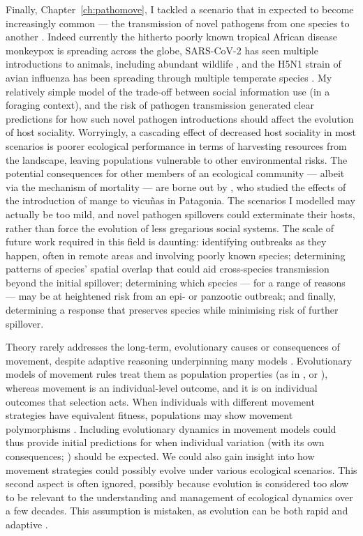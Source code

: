 Finally, Chapter~\ref{ch:pathomove}, I tackled a scenario that in expected to become increasingly common --- the transmission of novel pathogens from one species to another \citep{carlson2022a}.
Indeed currently the hitherto poorly known tropical African disease monkeypox is spreading across the globe, SARS-CoV-2 has seen multiple introductions to animals, including abundant wildlife \citep{kuchipudi2022}, and the H5N1 strain of avian influenza has been spreading through multiple temperate species \citep{wille2022}.
My relatively simple model of the trade-off between social information use (in a foraging context), and the risk of pathogen transmission generated clear predictions for how such novel pathogen introductions should affect the evolution of host sociality.
Worryingly, a cascading effect of decreased host sociality in most scenarios is poorer ecological performance in terms of harvesting resources from the landscape, leaving populations vulnerable to other environmental risks.
The potential consequences for other members of an ecological community --- albeit via the mechanism of mortality --- are borne out by \citet{monk2022}, who studied the effects of the introduction of mange to vicu\~{n}as in Patagonia.
The scenarios I modelled may actually be too mild, and novel pathogen spillovers could exterminate their hosts, rather than force the evolution of less gregarious social systems.
The scale of future work required in this field is daunting: identifying outbreaks as they happen, often in remote areas and involving poorly known species; determining patterns of species' spatial overlap that could aid cross-species transmission beyond the initial spillover; determining which species --- for a range of reasons --- may be at heightened risk from an epi- or panzootic outbreak; and finally, determining a response that preserves species while minimising risk of further spillover.

Theory rarely addresses the long-term, evolutionary causes or consequences of movement, despite adaptive reasoning underpinning many models \citep{charnov1976,fretwell1970}.
Evolutionary models of movement rules treat them as population properties (as in \cite*[]{dejager2011,dejager2020}, or \cite*[]{morris2011}), whereas movement is an individual-level outcome, and it is on individual outcomes that selection acts.
When individuals with different movement strategies have equivalent fitness, populations may show movement polymorphisms \citep{wolf2012,shaw2020,getz2015}.
Including evolutionary dynamics in movement models could thus provide initial predictions for when individual variation (with its own consequences; \cite{spiegel2017}) should be expected.
We could also gain insight into how movement strategies could possibly evolve under various ecological scenarios.
This second aspect is often ignored, possibly because evolution is considered too slow to be relevant to the understanding and management of ecological dynamics over a few decades.
This assumption is mistaken, as evolution can be both rapid and adaptive \citep[][]{bonnet2022}.

